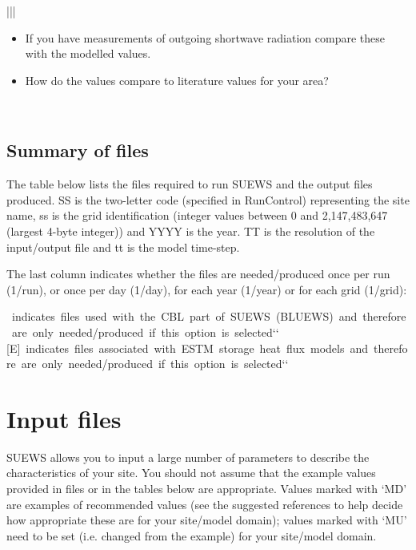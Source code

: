 \documentclass[letterpaper,10pt,english]{sphinxmanual}
\begin{document}
\begin{savenotes}
\begin{tabular}[t]{|||}
\begin{description}
\begin{itemize}
\item {} 
If you have measurements of outgoing shortwave radiation compare these with the modelled values.

\item {} 
How do the values compare to literature values for your area?

\end{itemize}

\end{description}
\\
\hline
\end{tabular}
\par
\sphinxattableend\end{savenotes}


\section{Summary of files}
\label{\detokenize{prepare-to-run-the-model:summary-of-files}}
The table below lists the files required to run SUEWS and the output
files produced. SS is the two-letter code (specified in RunControl)
representing the site name, ss is the grid identification (integer
values between 0 and 2,147,483,647 (largest 4-byte integer)) and YYYY is
the year. TT is the resolution of the input/output file and tt is the
model time-step.

The last column indicates whether the files are needed/produced once per
run (1/run), or once per day (1/day), for each year (1/year) or for each
grid (1/grid):

%
\begin{sphinxVerbatim}[commandchars=\\\{\}]
[B] indicates files used with the CBL part of SUEWS (BLUEWS) and therefore are only needed/produced if this option is selected{}`{}`
[E] indicates files associated with ESTM storage heat flux models and therefore are only needed/produced if this option is selected{}`{}`
\end{sphinxVerbatim}


\chapter{Input files}
\label{\detokenize{input_files/input_files::doc}}\label{\detokenize{input_files/input_files:input-files}}\label{\detokenize{input_files/input_files:id1}}
SUEWS allows you to input a large number of parameters to describe the
characteristics of your site. You should not assume that the example
values provided in files or in the tables below are appropriate. Values
marked with ‘MD’ are examples of recommended values (see the suggested
references to help decide how appropriate these are for your site/model
domain); values marked with ‘MU’ need to be set (i.e. changed from the
example) for your site/model domain.
\label{\detokenize{input_files/RunControl/RunControl:runcontrol}}
\end{document}
